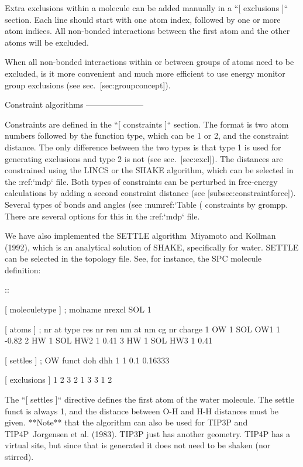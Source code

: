 Extra exclusions within a molecule can be added manually in a
``[ exclusions ]`` section. Each line should start with one
atom index, followed by one or more atom indices. All non-bonded
interactions between the first atom and the other atoms will be
excluded.

When all non-bonded interactions within or between groups of atoms need
to be excluded, is it more convenient and much more efficient to use
energy monitor group exclusions (see sec. [sec:groupconcept]).

Constraint algorithms
---------------------

Constraints are defined in the ``[ constraints ]`` section. The format is two atom numbers
followed by the function type, which can be 1 or 2, and the constraint
distance. The only difference between the two types is that type 1 is
used for generating exclusions and type 2 is not (see sec. [sec:excl]).
The distances are constrained using the LINCS or the SHAKE algorithm,
which can be selected in the :ref:`mdp` file. Both types of constraints can be
perturbed in free-energy calculations by adding a second constraint
distance (see [subsec:constraintforce]). Several types of bonds and
angles (see :numref:`Table (%
constraints by grompp. There are several options for this in the :ref:`mdp`
file.

We have also implemented the SETTLE algorithm Miyamoto and Kollman
(1992), which is an analytical solution of SHAKE, specifically for
water. SETTLE can be selected in the topology file. See, for instance,
the SPC molecule definition:

::

    [ moleculetype ]
    ; molname       nrexcl
    SOL             1

    [ atoms ]
    ; nr    at type res nr  ren nm  at nm   cg nr   charge
    1       OW      1       SOL     OW1     1       -0.82
    2       HW      1       SOL     HW2     1        0.41
    3       HW      1       SOL     HW3     1        0.41

    [ settles ]
    ; OW    funct   doh     dhh
    1       1       0.1     0.16333

    [ exclusions ]
    1       2       3
    2       1       3
    3       1       2

The ``[ settles ]`` directive defines the first atom of the
water molecule. The settle funct is always 1, and the distance between
O-H and H-H distances must be given. **Note** that the algorithm can
also be used for TIP3P and TIP4P Jorgensen et al. (1983). TIP3P just has
another geometry. TIP4P has a virtual site, but since that is generated
it does not need to be shaken (nor stirred).


